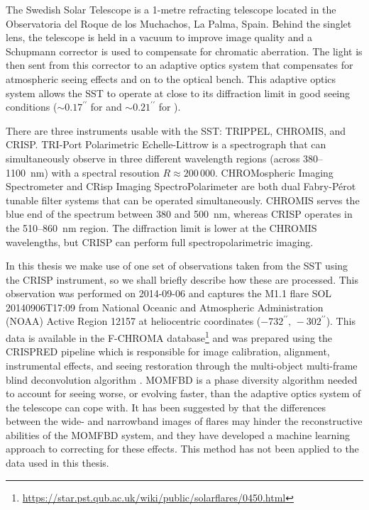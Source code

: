 The Swedish Solar Telescope \citep[SST,][]{Scharmer2003} is a 1-metre refracting telescope located in the Observatoria del Roque de los Muchachos, La Palma, Spain.
Behind the singlet lens, the telescope is held in a vacuum to improve image quality and a Schupmann corrector is used to compensate for chromatic aberration.
The light is then sent from this corrector to an adaptive optics system that compensates for atmospheric seeing effects and on to the optical bench.
This adaptive optics system allows the SST to operate at close to its diffraction limit in good seeing conditions ($\sim 0.17^{\prime\prime}$ for \Ha{} and $\sim 0.21^{\prime\prime}$ for \CaLine{}). %

There are three instruments usable with the SST: TRIPPEL, CHROMIS, and CRISP.
TRI-Port Polarimetric Echelle-Littrow \citep[TRIPPEL, ][]{Kiselman2011} is a spectrograph that can simultaneously observe in three different wavelength regions (across 380--\SI{1100}{\nano\m}) with a spectral resoution $R\approx200\,000$.
CHROMospheric Imaging Spectrometer \citep[CHROMIS, ][]{Lofdahl2021} and CRisp Imaging SpectroPolarimeter \citep[CRISP, ][]{Scharmer2008,Scharmer2019} are both dual Fabry-Pérot tunable filter systems that can be operated simultaneously.
CHROMIS serves the blue end of the spectrum between 380 and \SI{500}{\nano\m}, whereas CRISP operates in the 510--\SI{860}{\nano\m} region.
The diffraction limit is lower at the CHROMIS wavelengths, but CRISP can perform full spectropolarimetric imaging.

In this thesis we make use of one set of observations taken from the SST using the CRISP instrument, so we shall briefly describe how these are processed.
This observation was performed on 2014-09-06 and captures the M1.1 flare SOL 20140906T17:09 from National Oceanic and Atmospheric Administration (NOAA) Active Region 12157 at heliocentric coordinates ($-732^{\prime\prime},\,-302^{\prime\prime}$).
This data is available in the F-CHROMA database\footnote{\url{https://star.pst.qub.ac.uk/wiki/public/solarflares/0450.html}} and was prepared using the CRISPRED pipeline \citep{DelaCruzRodriguez2015} which is responsible for image calibration, alignment, instrumental effects, and seeing restoration through the multi-object multi-frame blind deconvolution algorithm \citep[MOMFBD, ][]{VanNoort2005}.
MOMFBD is a phase diversity algorithm needed to account for seeing worse, or evolving faster, than the adaptive optics system of the telescope can cope with.
It has been suggested by \citet{Armstrong2021} that the differences between the wide- and narrowband images of flares may hinder the reconstructive abilities of the MOMFBD system, and they have developed a machine learning approach to correcting for these effects.
This method has not been applied to the data used in this thesis.

